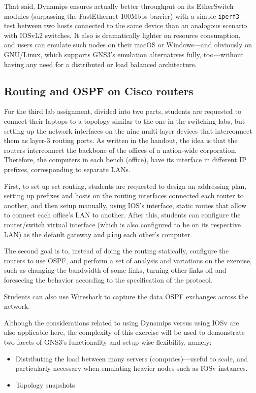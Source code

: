That said, Dynamips ensures actually better throughput on its EtherSwitch modules (surpassing the FastEthernet 100Mbps barrier) with a simple \texttt{iperf3} test between two hosts connected to the same device than an analogous scenario with IOSvL2 switches. %
It also is dramatically lighter on resource consumption, and users can emulate such nodes on their macOS or Windows---and obviously on GNU/Linux, which supports GNS3's emulation alternatives fully, too---without having any need for a distributed or load balanced architecture.

\subsection{Routing and OSPF on Cisco routers}
\label{subsec:gns3ospfrouting}

For the third lab assignment, divided into two parts, students are requested to connect their laptops to a topology similar to the one in the switching labs, but setting up the network interfaces on the nine multi-layer devices that interconnect them as layer-3 routing ports.
As written in the handout, the idea is that the routers interconnect the backbone of the offices of a nation-wide corporation.
Therefore, the computers in each bench (office), have its interface in different IP prefixes, corresponding to separate LANs. %

First, to set up set routing, students are requested to design an addressing plan, setting up prefixes and hosts on the routing interfaces connected each router to another, and then setup manually, using IOS's interface, static routes that allow to connect each office's LAN to another.
After this, students can configure the router/switch virtual interface (which is also configured to be on its respective LAN) as the default gateway and \texttt{ping} each other's computer.

The second goal is to, instead of doing the routing statically, configure the routers to use OSPF, and perform a set of analysis and variations on the exercise, such as changing the bandwidth of some links, turning other links off and foreseeing the behavior according to the specification of the protocol.

Students can also use Wireshark to capture the data OSPF exchanges across the network.

Although the considerations related to using Dynamips versus using IOSv are also applicable here, the complexity of this exercise will be used to demonstrate two facets of GNS3's functionality and setup-wise flexibility, namely:
\begin{itemize}
  \item Distributing the load between many servers (computes)---useful to scale, and particularly necessary when emulating heavier nodes such as IOSv instances.
  \item Topology snapshots
\end{itemize}

